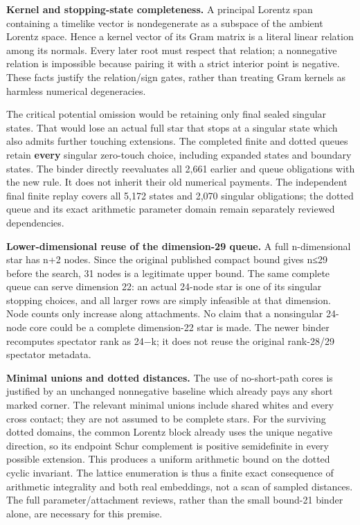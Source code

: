 \documentclass[
  10pt,
]{report}
\begin{document}
\textbf{Kernel and stopping-state completeness.} A principal Lorentz
span containing a timelike vector is nondegenerate as a subspace of the
ambient Lorentz space. Hence a kernel vector of its Gram matrix is a
literal linear relation among its normals. Every later root must respect
that relation; a nonnegative relation is impossible because pairing it
with a strict interior point is negative. These facts justify the
relation/sign gates, rather than treating Gram kernels as harmless
numerical degeneracies.

The critical potential omission would be retaining only final sealed
singular states. That would lose an actual full star that stops at a
singular state which also admits further touching extensions. The
completed finite and dotted queues retain \textbf{every} singular
zero-touch choice, including expanded states and boundary states. The
binder directly reevaluates all 2,661 earlier and queue obligations with
the new rule. It does not inherit their old numerical payments. The
independent final finite replay covers all 5,172 states and 2,070
singular obligations; the dotted queue and its exact arithmetic
parameter domain remain separately reviewed dependencies.

\textbf{Lower-dimensional reuse of the dimension-29 queue.} A full
n-dimensional star has n+2 nodes. Since the original published compact
bound gives n≤29 before the search, 31 nodes is a legitimate upper
bound. The same complete queue can serve dimension 22: an actual 24-node
star is one of its singular stopping choices, and all larger rows are
simply infeasible at that dimension. Node counts only increase along
attachments. No claim that a nonsingular 24-node core could be a
complete dimension-22 star is made. The newer binder recomputes
spectator rank as 24−k; it does not reuse the original rank-28/29
spectator metadata.

\textbf{Minimal unions and dotted distances.} The use of no-short-path
cores is justified by an unchanged nonnegative baseline which already
pays any short marked corner. The relevant minimal unions include shared
whites and every cross contact; they are not assumed to be complete
stars. For the surviving dotted domains, the common Lorentz block
already uses the unique negative direction, so its endpoint Schur
complement is positive semidefinite in every possible extension. This
produces a uniform arithmetic bound on the dotted cyclic invariant. The
lattice enumeration is thus a finite exact consequence of arithmetic
integrality and both real embeddings, not a scan of sampled distances.
The full parameter/attachment reviews, rather than the small bound-21
binder alone, are necessary for this premise.
\end{document}
